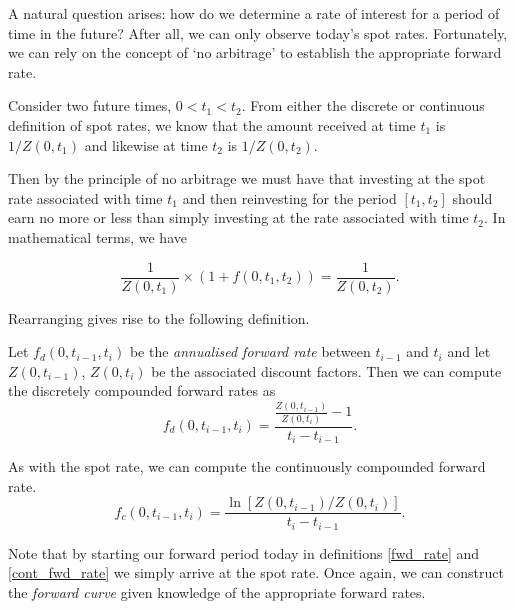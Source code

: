A natural question arises: how do we determine a rate of interest for a period of time in the future? After all, we can only observe today's spot rates. Fortunately, we can rely on the concept of `no arbitrage' to establish the appropriate forward rate.

Consider two future times, $0 < t_1 < t_2$. From either the discrete or continuous definition of spot rates, we know that the amount received at time $t_1$ is $1/Z(0,t_1)$ and likewise at time $t_2$ is $1/Z(0,t_2)$. 

Then by the principle of no arbitrage we must have that investing at the spot rate associated with time $t_1$ and then reinvesting for the period $[t_1, t_2]$ should earn no more or less than simply investing at the rate associated with time $t_2$. In mathematical terms, we have

\begin{equation}
    \frac{1}{Z(0, t_1)} \times (1 + f(0,t_1,t_2)) = \frac{1}{Z(0, t_2)}.
\end{equation}

Rearranging gives rise to the following definition.

\begin{definition}
\label{fwd_rate}
    Let $f_d(0,t_{i-1},t_i)$ be the \textit{annualised forward rate} between $t_{i-1}$ and $t_i$ and let $Z(0,t_{i-1})$, $Z(0,t_i)$ be the associated discount factors. Then we can compute the discretely compounded forward rates as
    \begin{equation}
        f_d(0, t_{i-1}, t_i) = \frac{\frac{Z(0, t_{i-1})}{Z(0,t_i)} - 1}{t_i - t_{i-1}}.
    \end{equation}
\end{definition}

\begin{definition}
\label{cont_fwd_rate}
    As with the spot rate, we can compute the continuously compounded forward rate.
    \begin{equation}
        f_{c}(0,t_{i-1}, t_i) = \frac{\ln [ Z(0,t_{i-1}) / Z(0,t_i)]}{t_i - t_{i-1}}.
    \end{equation}
\end{definition}

Note that by starting our forward period today in definitions \ref{fwd_rate} and \ref{cont_fwd_rate} we simply arrive at the spot rate. Once again, we can construct the \textit{forward curve} given knowledge of the appropriate forward rates.

